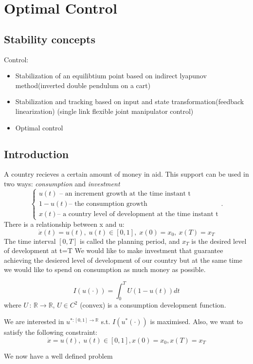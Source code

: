 \chapter{Optimal Control}
\section{Stability concepts}
Control:
\begin{itemize}
        \item Stabilization of an equilibtium point based on indirect lyapunov method(inverted double pendulum on a cart)
        \item Stabilization and tracking based on input and state transformation(feedback linearization) (single link flexible joint manipulator control)
        \item Optimal control
        
\end{itemize}
\section{Introduction}
\ex{}
{
    A country recieves a certain amount of money in aid. This support can be used in two ways: \textit{consumption} and \textit{investment}
    \[
    \begin{cases}
        u(t) \text{ -- an increment growth at the time instant t}\\
        1-u(t) \text{-- the consumption growth}\\
        x(t) \text{-- a country level of development at the time instant t}
    \end{cases}
    .\] 
    There is a relationship between x and u:
    \begin{equation}
        \dot{x}(t) = u(t),\; u(t) \in [0,1],\; x(0)=x_0,\: x(T)=x_T
    \end{equation}
    The time interval $[0,T]$ is called the planning period, and  $x_T$ is the desired level of development at t=T
    We would like to make investment that guarantee achieving the desiered level of development of our country
    but at the same time we would like to spend on consumption as much money as possible.

    \begin{equation}
        I(u(\cdot)) = \int_0^TU(1-u(t))dt
    \end{equation}
    where $U\,:\,\mathbb{R} \longrightarrow \mathbb{R} $, $U\in C^{2}$ (convex) is a consumption development function.

    \nt
    {
        We are interested in $u^{*: [0,1] \longrightarrow \mathbb{R}}$ s.t.
        $I(u^{*}(\cdot))$ is maximised.
        Also, we want to satisfy the following constraint:
        \begin{equation}
            \dot{x} = u(t),\; u(t) \in[0,1], x(0) = x_0, x(T) = x_T
        \end{equation}

        We now have a well defined problem
    }


}

